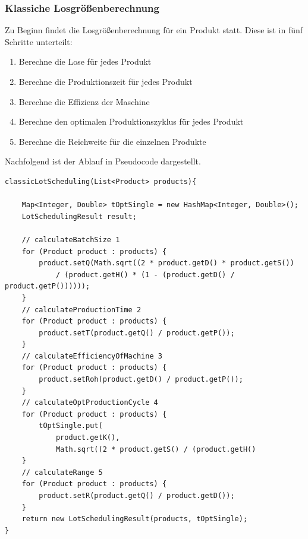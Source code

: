 \documentclass[12pt,a4paper, listof=entryprefix, bibliography=totocnumbered,toc=listofnumbered,lof=listofnumbered]{scrartcl}
\begin{document}
\subsubsection{Klassiche Losgrößenberechnung}
Zu Beginn findet die Losgrößenberechnung für ein Produkt statt. Diese ist in fünf Schritte unterteilt:
\begin{enumerate}
	\item Berechne die Lose für jedes Produkt
	\item Berechne die Produktionszeit für jedes Produkt
	\item Berechne die Effizienz der Maschine
	\item Berechne den optimalen Produktionszyklus für jedes Produkt
	\item Berechne die Reichweite für die einzelnen Produkte
\end{enumerate}
Nachfolgend ist der Ablauf in Pseudocode dargestellt.
\begin{lstlisting}[caption= Beispielprogramm, label=lst:code]
classicLotScheduling(List<Product> products){

    Map<Integer, Double> tOptSingle = new HashMap<Integer, Double>();
    LotSchedulingResult result;

	// calculateBatchSize 1
	for (Product product : products) {
	    product.setQ(Math.sqrt((2 * product.getD() * product.getS())
		    / (product.getH() * (1 - (product.getD() / product.getP())))));
	}
	// calculateProductionTime 2
	for (Product product : products) {
	    product.setT(product.getQ() / product.getP());
	}
	// calculateEfficiencyOfMachine 3
	for (Product product : products) {
	    product.setRoh(product.getD() / product.getP());
	}
	// calculateOptProductionCycle 4
	for (Product product : products) {
	    tOptSingle.put(
		    product.getK(),
		    Math.sqrt((2 * product.getS() / (product.getH()
	}
	// calculateRange 5
	for (Product product : products) {
	    product.setR(product.getQ() / product.getD());
	}
	return new LotSchedulingResult(products, tOptSingle);
}
\end{lstlisting}
\end{document}
